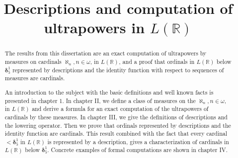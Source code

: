 \documentclass[bibother]{asl}
\theoremstyle{definition}
\theoremstyle{remark}
\newcommand{\ad}{\textsf{AD}}
\newcommand{\bd}{\boldsymbol{\delta}}
\newcommand{\om}{\omega}
\newcommand{\LR}{{L(\mathbb{R})}}
\newcommand{\al}[1]{{\aleph_{#1}}}
\begin{document}
\title{Descriptions and computation of ultrapowers in $\LR$}


\begin{abstract}
The results from this dissertation are an exact computation of ultrapowers by measures on cardinals $\al{n}, n\in\om$, in $\LR$, 
and a proof that ordinals in $\LR$ below $\bd^1_5$ represented by descriptions and the identity function with respect to sequences of
measures are cardinals.

An introduction to the subject with the basic definitions and well known facts is presented in chapter 1.
%
In chapter II, we define a class of measures on the $\al{n}, n\in\om$, in $\LR$ and derive a formula for an exact computation of 
the ultrapowers of cardinals by these measures.
%
In chapter III, we give the definitions of descriptions and the lowering operator. Then we prove that ordinals represented by descriptions
and the identity function are cardinals. This result combined with the fact that every cardinal $<\bd^1_5$ in $\LR$ is represented by a description, gives
a characterization of cardinals in $\LR$ below $\bd^1_5$.
%
Concrete examples of formal computations are shown in chapter IV.








\end{abstract}

\maketitle
\end{document}
